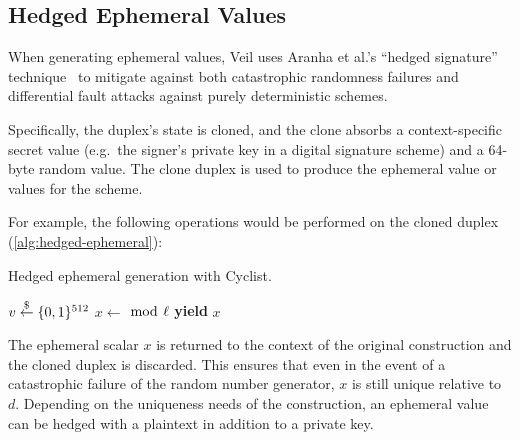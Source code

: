 \subsection{Hedged Ephemeral Values}\label{subsec:cons-hedged-ephemeral-values}

When generating ephemeral values, Veil uses Aranha et al.'s ``hedged signature''
technique~\cite{aranha2020} to mitigate against both catastrophic randomness failures and
differential fault attacks against purely deterministic schemes.

Specifically, the duplex's state is cloned, and the clone absorbs a context-specific secret value
(e.g.\ the signer's private key in a digital signature scheme) and a 64-byte random value. The clone
duplex is used to produce the ephemeral value or values for the scheme.

For example, the following operations would be performed on the cloned duplex
(\ref{alg:hedged-ephemeral}):

\begin{algorithm}
    \caption{Hedged ephemeral generation with Cyclist.}
    \begin{algorithmic}[0]
        \Clone {}
        \State {}
        \State $v \stackrel{\$}{\gets} \{0,1\}^{512}$
        \State {}
        \State $x \gets$  $\bmod~\ell$
        \State \textbf{yield} $x$
        \End {}
    \end{algorithmic}
    \label{alg:hedged-ephemeral}
\end{algorithm}

The ephemeral scalar $x$ is returned to the context of the original construction and the cloned
duplex is discarded. This ensures that even in the event of a catastrophic failure of the random
number generator, $x$ is still unique relative to $d$. Depending on the uniqueness needs of the
construction, an ephemeral value can be hedged with a plaintext in addition to a private key.
